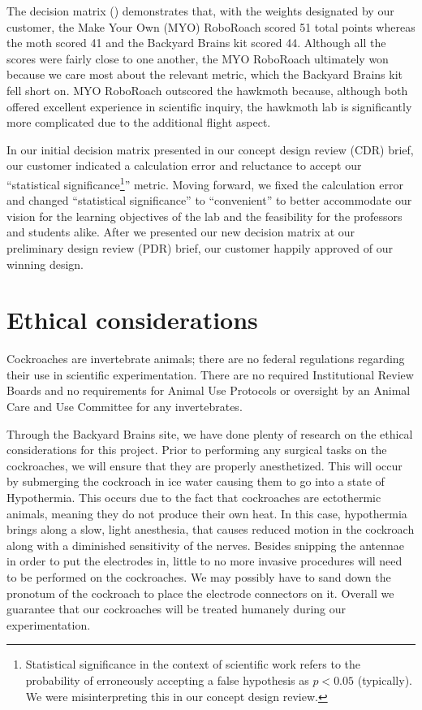 \documentclass[twocolumn,10pt]{IEEEtran}
\begin{document}
The decision matrix () demonstrates that, with the weights designated by our customer, the Make Your Own (MYO) RoboRoach scored 51 total points whereas the moth scored 41 and the Backyard Brains kit scored 44. Although all the scores were fairly close to one another, the MYO RoboRoach ultimately won because we care most about the relevant metric, which the Backyard Brains kit fell short on. MYO RoboRoach outscored the hawkmoth because, although both offered excellent experience in scientific inquiry, the hawkmoth lab is significantly more complicated due to the additional flight aspect.

In our initial decision matrix presented in our concept design review (CDR) brief, our customer indicated a calculation error and reluctance to accept our ``statistical significance\footnote{Statistical significance in the context of scientific work refers to the probability of erroneously accepting a false hypothesis as $p<0.05$ (typically). We were misinterpreting this in our concept design review.}'' metric. Moving forward, we fixed the calculation error and changed ``statistical significance'' to ``convenient'' to better accommodate our vision for the learning objectives of the lab and the feasibility for the professors and students alike. After we presented our new decision matrix at our preliminary design review (PDR) brief, our customer happily approved of our winning design.

\section{Ethical considerations}
Cockroaches are invertebrate animals; there are no federal regulations regarding their use in scientific experimentation. There are no required Institutional Review Boards and no requirements for Animal Use Protocols or oversight by an Animal Care and Use Committee for any invertebrates.

Through the Backyard Brains site, we have done plenty of research on the ethical considerations for this project. Prior to performing any surgical tasks on the cockroaches, we will ensure that they are properly anesthetized. This will occur by submerging the cockroach in ice water causing them to go into a state of Hypothermia. This occurs due to the fact that cockroaches are ectothermic animals, meaning they do not produce their own heat. In this case, hypothermia brings along a slow, light anesthesia, that causes reduced motion in the cockroach along with a diminished sensitivity of the nerves. Besides snipping the antennae in order to put the electrodes in, little to no more invasive procedures will need to be performed on the cockroaches. We may possibly have to sand down the pronotum of the cockroach to place the electrode connectors on it. Overall we guarantee that our cockroaches will be treated humanely during our experimentation.
\end{document}
